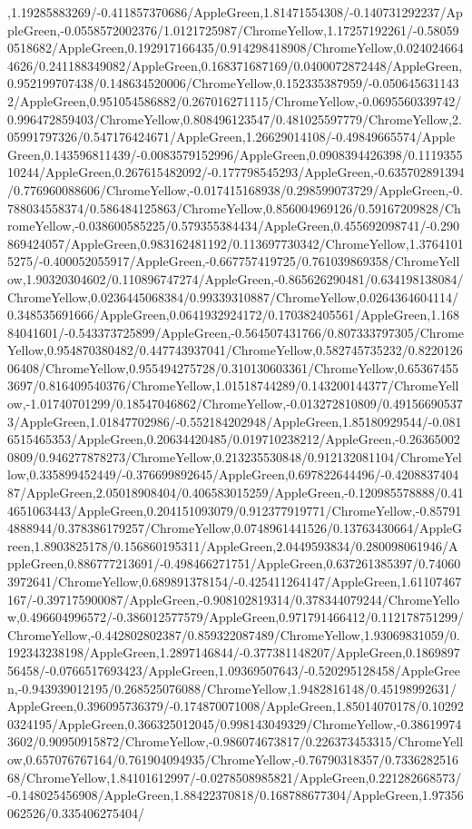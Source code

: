 {\begin{tikzternal}
,1.19285883269/-0.411857370686/AppleGreen,1.81471554308/-0.140731292237/AppleGreen,-0.0558572002376/1.0121725987/ChromeYellow,1.17257192261/-0.580590518682/AppleGreen,0.192917166435/0.914298418908/ChromeYellow,0.0240246644626/0.241188349082/AppleGreen,0.168371687169/0.0400072872448/AppleGreen,0.952199707438/0.148634520006/ChromeYellow,0.152335387959/-0.0506456311432/AppleGreen,0.951054586882/0.267016271115/ChromeYellow,-0.0695560339742/0.996472859403/ChromeYellow,0.808496123547/0.481025597779/ChromeYellow,2.05991797326/0.547176424671/AppleGreen,1.26629014108/-0.49849665574/AppleGreen,0.143596811439/-0.0083579152996/AppleGreen,0.0908394426398/0.111935510244/AppleGreen,0.267615482092/-0.177798545293/AppleGreen,-0.635702891394/0.776960088606/ChromeYellow,-0.017415168938/0.298599073729/AppleGreen,-0.788034558374/0.586484125863/ChromeYellow,0.856004969126/0.59167209828/ChromeYellow,-0.038600585225/0.579355384434/AppleGreen,0.455692098741/-0.290869424057/AppleGreen,0.983162481192/0.113697730342/ChromeYellow,1.37641015275/-0.400052055917/AppleGreen,-0.667757419725/0.761039869358/ChromeYellow,1.90320304602/0.110896747274/AppleGreen,-0.865626290481/0.634198138084/ChromeYellow,0.0236445068384/0.99339310887/ChromeYellow,0.0264364604114/0.348535691666/AppleGreen,0.0641932924172/0.170382405561/AppleGreen,1.16884041601/-0.543373725899/AppleGreen,-0.564507431766/0.807333797305/ChromeYellow,0.954870380482/0.447743937041/ChromeYellow,0.582745735232/0.822012606408/ChromeYellow,0.955494275728/0.310130603361/ChromeYellow,0.653674553697/0.816409540376/ChromeYellow,1.01518744289/0.143200144377/ChromeYellow,-1.01740701299/0.18547046862/ChromeYellow,-0.013272810809/0.491566905373/AppleGreen,1.01847702986/-0.552184202948/AppleGreen,1.85180929544/-0.0816515465353/AppleGreen,0.20634420485/0.019710238212/AppleGreen,-0.263650020809/0.946277878273/ChromeYellow,0.213235530848/0.912132081104/ChromeYellow,0.335899452449/-0.376699892645/AppleGreen,0.697822644496/-0.420883740487/AppleGreen,2.05018908404/0.406583015259/AppleGreen,-0.120985578888/0.414651063443/AppleGreen,0.204151093079/0.912377919771/ChromeYellow,-0.857914888944/0.378386179257/ChromeYellow,0.0748961441526/0.13763430664/AppleGreen,1.8903825178/0.156860195311/AppleGreen,2.0449593834/0.280098061946/AppleGreen,0.886777213691/-0.498466271751/AppleGreen,0.637261385397/0.740603972641/ChromeYellow,0.689891378154/-0.425411264147/AppleGreen,1.61107467167/-0.397175900087/AppleGreen,-0.908102819314/0.378344079244/ChromeYellow,0.496604996572/-0.386012577579/AppleGreen,0.971791466412/0.112178751299/ChromeYellow,-0.442802802387/0.859322087489/ChromeYellow,1.93069831059/0.192343238198/AppleGreen,1.2897146844/-0.377381148207/AppleGreen,0.186989756458/-0.0766517693423/AppleGreen,1.09369507643/-0.520295128458/AppleGreen,-0.943939012195/0.268525076088/ChromeYellow,1.9482816148/0.45198992631/AppleGreen,0.396095736379/-0.174870071008/AppleGreen,1.85014070178/0.102920324195/AppleGreen,0.366325012045/0.998143049329/ChromeYellow,-0.386199743602/0.90950915872/ChromeYellow,-0.986074673817/0.226373453315/ChromeYellow,0.657076767164/0.761904094935/ChromeYellow,-0.76790318357/0.733628251668/ChromeYellow,1.84101612997/-0.0278508985821/AppleGreen,0.221282668573/-0.148025456908/AppleGreen,1.88422370818/0.168788677304/AppleGreen,1.97356062526/0.335406275404/
\end{tikzternal}}
